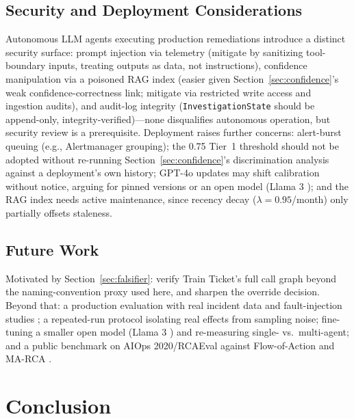 \documentclass[10pt,conference]{IEEEtran}
\begin{document}
\subsection{Security and Deployment Considerations}
Autonomous LLM agents executing production remediations \cite{burns2016borg}
introduce a distinct security surface: prompt injection via telemetry
(mitigate by sanitizing tool-boundary inputs, treating outputs as data,
not instructions), confidence manipulation via a poisoned RAG index
(easier given Section~\ref{sec:confidence}'s weak confidence-correctness
link; mitigate via restricted write access and ingestion audits), and
audit-log integrity (\texttt{InvestigationState} should be append-only,
integrity-verified)---none disqualifies autonomous operation, but security
review is a prerequisite. Deployment raises further concerns: alert-burst
queuing (e.g., Alertmanager grouping); the 0.75 Tier~1 threshold should
not be adopted without re-running Section~\ref{sec:confidence}'s
discrimination analysis against a deployment's own history; GPT-4o
updates may shift calibration without notice, arguing for pinned versions
or an open model (Llama 3 \cite{meta2024llama3}); and the RAG index needs
active maintenance, since recency decay ($\lambda=0.95$/month) only
partially offsets staleness.

\subsection{Future Work}
Motivated by Section~\ref{sec:falsifier}: verify Train Ticket's full call
graph beyond the naming-convention proxy used here, and sharpen the
override decision. Beyond that: a production
evaluation with real incident data and fault-injection studies
\cite{basiri2016chaos}; a repeated-run protocol isolating real effects
from sampling noise; fine-tuning a smaller open model (Llama 3
\cite{meta2024llama3}) and re-measuring single- vs.\ multi-agent; and a
public benchmark on AIOps 2020/RCAEval against Flow-of-Action
\cite{pei2025flowofaction} and MA-RCA \cite{fu2026marca}.

\section{Conclusion}
\label{sec:conclusion}
\end{document}

